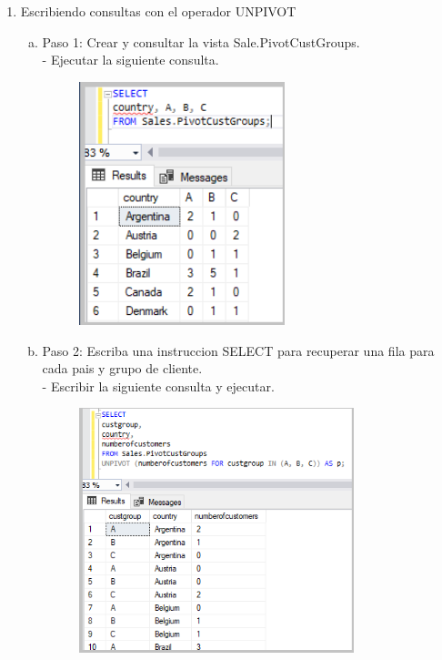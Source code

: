 \begin{enumerate}[1.]
	\item Escribiendo consultas con el operador UNPIVOT
	\begin{enumerate}[a)]
	\item Paso 1: Crear y consultar la vista Sale.PivotCustGroups.\\
		
		-  Ejecutar la siguiente consulta.
		\begin{figure}[H]
		\begin{center}
		\includegraphics[width=6cm]{./Imagenes/e1-1-1}
		\end{center}
		\end{figure}
	\item Paso 2: Escriba una instruccion SELECT para recuperar una fila para cada pais y grupo de cliente.\\
		-  Escribir la siguiente consulta y ejecutar.\\
		\begin{figure}[H]
		\begin{center}
		\includegraphics[width=8cm]{./Imagenes/e2-2}
		\end{center}
		\end{figure}
	\end{enumerate}




\end{enumerate}
